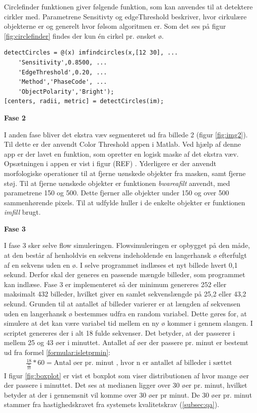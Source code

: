 Circlefinder funktionen giver følgende funktion, som kan anvendes til at detektere cirkler med. Parametrene Sensitivty og edgeThreshold beskriver, hvor cirkulære objekterne er og generelt hvor følsom algoritmen er. Som det ses på figur \ref{fig:circlefinder} findes der kun én cirkel pr. ønsket ø.
\begin{lstlisting} 
detectCircles = @(x) imfindcircles(x,[12 30], ...
	'Sensitivity',0.8500, ...
	'EdgeThreshold',0.20, ...
	'Method','PhaseCode', ...
	'ObjectPolarity','Bright');
[centers, radii, metric] = detectCircles(im);
\end{lstlisting} 


\textbf{Fase 2}

I anden fase bliver det ekstra væv segmenteret ud fra billede 2 (figur \ref{fig:img2}). Til dette er der anvendt Color Threshold appen i Matlab. Ved hjælp af denne app er der lavet en funktion, som opretter en logisk maske af det ekstra væv. Opsætningen i appen er vist i figur (REF) . Yderligere er der anvendt morfologiske operationer til at fjerne uønskede objekter fra masken, samt fjerne støj. Til at fjerne uønskede objekter er funktionen \textit{bwareafilt} anvendt, med parametrene 150 og 500. Dette fjerner alle objekter under 150 og over 500 sammenhørende pixels. Til at udfylde huller i de enkelte objekter er funktionen \textit{imfill} brugt. 

\textbf{Fase 3}

I fase 3 sker selve flow simuleringen. Flowsimuleringen er opbygget på den måde, at den består af henholdvis en sekvens indeholdende en langerhansk ø efterfulgt af en sekvens uden en ø. I selve programmet indlæses et nyt billede hvert 0,1 sekund. Derfor skal der generes en passende mængde billeder, som programmet kan indlæse. Fase 3 er implementeret så der minimum genereres 252 eller maksimalt 432 billeder, hvilket giver en samlet sekvenslængde på 25,2 eller 43,2 sekund. Grunden til at antallet af billeder varierer er at længden af sekvensen uden en langerhansk ø bestemmes udfra en random variabel. Dette gøres for, at simulere at det kan være variabel tid mellem en ny ø kommer i gennem slangen. I scriptet genereres der i alt 18 fulde sekvenser. Det betyder, at der passerer i mellem 25 og 43 øer i minuttet. Antallet af øer der passere pr. minut er bestemt ud fra formel \ref{formular:isletprmin}: 
\begin{align}
\frac{18}{\frac{n}{10}} * 60 = \text{Antal øer pr. minut}
\text{ , hvor n er antallet af billeder i sættet}
\label{formular:isletprmin}
\end{align} 
I figur \ref{fig:boxplot} er vist et boxplot som viser distributionen af hvor mange øer der passere i minuttet. Det ses at medianen ligger over 30 øer pr. minut, hvilket betyder at der i gennemsnit vil komme over 30 øer pr minut. De 30 øer pr. minut stammer fra hastighedskravet fra systemets kvalitetskrav (\ref{subsec:qa}).

